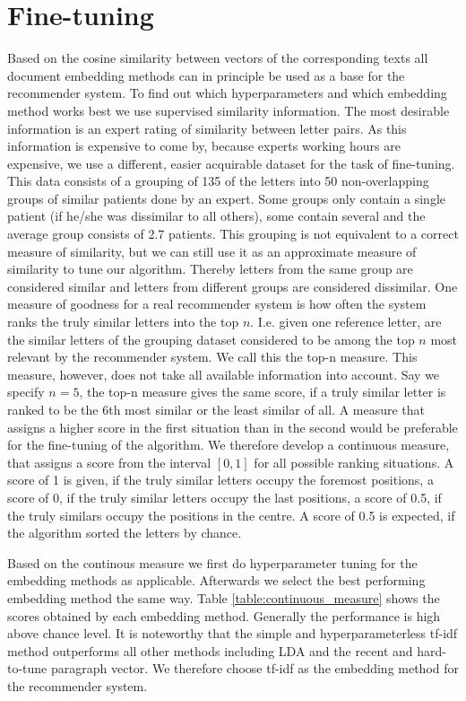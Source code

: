 \section{Fine-tuning}
Based on the cosine similarity between vectors of the corresponding texts all document embedding methods can in principle be used as a base for the recommender system. To find out which hyperparameters and which embedding method works best we use supervised similarity information. The most desirable information is an expert rating of similarity between letter pairs. As this information is expensive to come by, because experts working hours are expensive, we use a different, easier acquirable dataset for the task of fine-tuning. This data consists of a grouping of 135 of the letters into 50 non-overlapping groups of similar patients done by an expert. Some groups only contain a single patient (if he/she was dissimilar to all others), some contain several and the average group consists of 2.7 patients. This grouping is not equivalent to a correct measure of similarity, but we can still use it as an approximate measure of similarity to tune our algorithm. Thereby letters from the same group are considered similar and letters from different groups are considered dissimilar. One measure of goodness for a real recommender system is how often the system ranks the truly similar letters into the top $n$. I.e. given one reference letter, are the similar letters of the grouping dataset considered to be among the top $n$ most relevant by the recommender system.  We call this the top-n measure. This measure, however, does not take all available information into account. Say we specify $n=5$, the top-n measure gives the same score, if a truly similar letter is ranked to be the 6th most similar or the least similar of all. A measure that assigns a higher score in the first situation than in the second would be preferable for the fine-tuning of the algorithm. We therefore develop a continuous measure, that assigns a score from the interval $[0,1]$ for all possible ranking situations. A score of 1 is given, if the truly similar letters occupy the foremost positions, a score of 0, if the truly similar letters occupy the last positions, a score of 0.5, if the truly similars occupy the positions in the centre. A score of 0.5 is expected, if the algorithm sorted the letters by chance.

Based on the continous measure we first do hyperparameter tuning for the embedding methods as applicable. Afterwards we select the best performing embedding method the same way. Table \ref{table:continuous_measure} shows the scores obtained by each embedding method. Generally the performance is high above chance level. It is noteworthy that the simple and hyperparameterless tf-idf method outperforms all other methods including LDA and the recent and hard-to-tune paragraph vector. We therefore choose tf-idf as the embedding method for the recommender system. 

